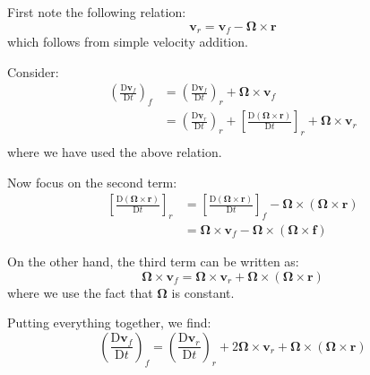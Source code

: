 \documentclass[12pt]{article}
\begin{document}
First note the following relation:
\begin{equation}
    \mathbf{v}_{r} = \mathbf{v}_{f} - \mathbf{\Omega} \times \mathbf{r}
\end{equation}
which follows from simple velocity addition.

Consider:
\begin{equation}
    \begin{split}
        \left( \frac{\mathrm{D} \mathbf{v}_{f}}{\mathrm{D} t} \right)_{f} &= \left( \frac{\mathrm{D} \mathbf{v}_{f}}{\mathrm{D} t} \right)_{r} + \mathbf{\Omega} \times \mathbf{v}_{f} \\
        &= \left( \frac{\mathrm{D} \mathbf{v}_{r}}{\mathrm{D} t} \right)_{r} + \left[ \frac{\mathrm{D} (\mathbf{\Omega} \times \mathbf{r})}{\mathrm{D} t} \right]_{r} + \mathbf{\Omega} \times \mathbf{v}_{r} \\
    \end{split}
\end{equation}
where we have used the above relation.

Now focus on the second term:
\begin{equation}
    \begin{split}
        \left[ \frac{\mathrm{D} (\mathbf{\Omega} \times \mathbf{r})}{\mathrm{D} t} \right]_{r} &= \left[ \frac{\mathrm{D} (\mathbf{\Omega} \times \mathbf{r})}{\mathrm{D} t} \right]_{f} - \mathbf{\Omega} \times (\mathbf{\Omega} \times \mathbf{r}) \\
        &= \mathbf{\Omega} \times \mathbf{v}_{f} - \mathbf{\Omega} \times (\mathbf{\Omega} \times \mathbf{f})
    \end{split}
\end{equation}

On the other hand, the third term can be written as:
\begin{equation}
    \mathbf{\Omega} \times \mathbf{v}_{f} = \mathbf{\Omega} \times \mathbf{v}_{r} + \mathbf{\Omega} \times (\mathbf{\Omega} \times \mathbf{r})
\end{equation}
where we use the fact that $\mathbf{\Omega}$ is constant.

Putting everything together, we find:
\begin{equation}
    \left( \frac{\mathrm{D} \mathbf{v}_{f}}{\mathrm{D} t} \right)_{f} = \left( \frac{\mathrm{D} \mathbf{v}_{r}}{\mathrm{D} t} \right)_{r} + 2 \mathbf{\Omega} \times \mathbf{v}_{r} + \mathbf{\Omega} \times (\mathbf{\Omega} \times \mathbf{r})
\end{equation}
\end{document}
